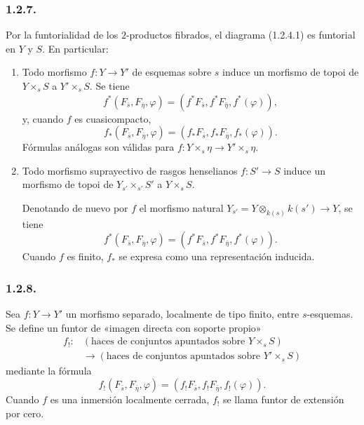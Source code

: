 \subsubsection*{1.2.7.}
Por la funtorialidad de los $2$-productos fibrados, el diagrama (1.2.4.1) es
funtorial en $Y$ y $S$. En particular:
\begin{enumerate}[label=\alph*)]
\item Todo morfismo $f:Y\longrightarrow Y'$ de esquemas sobre $s$ induce un
morfismo de topoi de $Y\times_sS$ a $Y'\times_sS$. Se tiene
\begin{equation}\tag{1.2.7.1}
f^*(F_{\bar s},F_{\bar\eta},\varphi)
=(f^*F_{\bar s},f^*F_{\bar\eta},f^*(\varphi)),
\end{equation}
y, cuando $f$ es cuasicompacto,
\begin{equation}\tag{1.2.7.2}
f_*(F_{\bar s},F_{\bar\eta},\varphi)
=(f_*F_{\bar s},f_*F_{\bar\eta},f_*(\varphi)).
\end{equation}
Fórmulas análogas son válidas para
$f:Y\times_s\eta\longrightarrow Y'\times_s\eta$.

\item Todo morfismo suprayectivo de rasgos henselianos
$f:S'\longrightarrow S$ induce un morfismo de topoi de
$Y_{s'}\times_{s'}S'$ a $Y\times_sS$.

\pageoriginale

Denotando de nuevo por $f$ el morfismo
natural $Y_{s'}=Y\otimes_{k(s)}k(s')\longrightarrow Y$, se tiene
\begin{equation}\tag{1.2.7.3}
f^*(F_{\bar s},F_{\bar\eta},\varphi)
=(f^*F_{\bar s},f^*F_{\bar\eta},f^*(\varphi)).
\end{equation}
Cuando $f$ es finito, $f_*$ se expresa como una representación inducida.
\end{enumerate}

\subsubsection*{1.2.8.}
Sea $f:Y\longrightarrow Y'$ un morfismo separado, localmente de tipo finito,
entre $s$-esquemas. Se define un funtor de «imagen directa con soporte propio»
\begin{equation*}
\begin{aligned}
f_!: {}&(\text{haces de conjuntos apuntados sobre }Y\times_sS)\\
&\longrightarrow
(\text{haces de conjuntos apuntados sobre }Y'\times_sS)
\end{aligned}
\end{equation*}
mediante la fórmula
\begin{equation}\tag{1.2.8.1}
f_!(F_{\bar s},F_{\bar\eta},\varphi)
=(f_!F_{\bar s},f_!F_{\bar\eta},f_!(\varphi)).
\end{equation}
Cuando $f$ es una inmersión localmente cerrada, $f_!$ se llama funtor de
extensión por cero.


